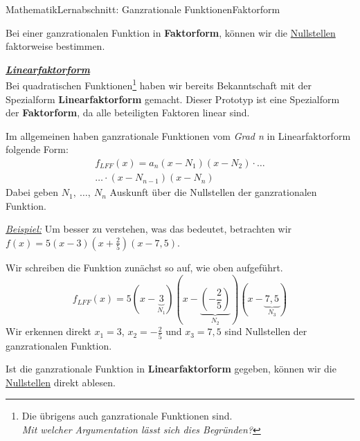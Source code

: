 \documentclass[11pt,twocolumn,oneside,openany,headings=optiontotoc,11pt,numbers=noenddot]{article}
\begin{document}
\begin{worksheet}{Mathematik}{Lernabschnitt: Ganzrationale Funktionen}{Faktorform}
\begin{framed}
			\noindent
			Bei einer ganzrationalen Funktion in \textbf{Faktorform}, können wir die \underline{Nullstellen} faktorweise bestimmen.
		\end{framed}
		\par
		\underline{\textbf{\textit{Linearfaktorform}}}\\
		Bei quadratischen Funktionen\footnote{Die übrigens auch ganzrationale Funktionen sind.\\ \textit{Mit welcher Argumentation lässt sich dies Begründen?}} haben wir bereits Bekanntschaft mit der Spezialform  \textbf{Linearfaktorform} gemacht. Dieser Prototyp ist eine Spezialform der \textbf{Faktorform}, da alle beteiligten Faktoren linear sind.\\
		\par\noindent
		Im allgemeinen haben ganzrationale Funktionen vom \textit{Grad n} in Linearfaktorform folgende Form: \begin{align*}
			f_{LFF}(x) = a_n(x-N_1)(x-N_2)\cdot\ldots\\
			\ldots\cdot(x-N_{n-1})(x-N_n)
		\end{align*}
		Dabei geben \(N_1,\ \ldots,\ N_n\) Auskunft über die Nullstellen der ganzrationalen Funktion.\\
		\par\noindent
		\underline{\textit{Beispiel:}} Um besser zu verstehen, was das bedeutet, betrachten wir \(f(x) = 5(x-3)(x+\frac{2}{5})(x-7,5)\).\\
		\par\noindent
		Wir schreiben die Funktion zunächst so auf, wie oben aufgeführt. \[f_{LFF}(x) = 5(x-\underbrace{3}_{N_1})(x-\underbrace{(-\frac{2}{5})}_{N_2})(x-\underbrace{7,5}_{N_3})\]
		Wir erkennen direkt \colorbox{green!10}{\(x_1 = 3\)}, \colorbox{green!10}{\(x_2 = -\frac{2}{5}\)} und \colorbox{green!10}{\(x_3 = 7,5\)} sind Nullstellen der ganzrationalen Funktion.
		\begin{framed}
			\noindent
			Ist die ganzrationale Funktion in \textbf{Linearfaktorform} gegeben, können wir die \underline{Nullstellen} direkt ablesen.
		\end{framed}

\end{worksheet}
\end{document}
